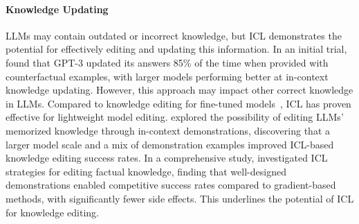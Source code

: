 \paragraph{Knowledge Updating}
LLMs may contain outdated or incorrect knowledge, but ICL demonstrates the potential for effectively editing and updating this information. In an initial trial, \citet{reliable} found that GPT-3 updated its answers 85\% of the time when provided with counterfactual examples, with larger models performing better at in-context knowledge updating. However, this approach may impact other correct knowledge in LLMs.
Compared to knowledge editing for fine-tuned models~\cite{editingfact}, ICL has proven effective for lightweight model editing. \citet{reliable} explored the possibility of editing LLMs' memorized knowledge through in-context demonstrations, discovering that a larger model scale and a mix of demonstration examples improved ICL-based knowledge editing success rates. In a comprehensive study, \citet{ike} investigated ICL strategies for editing factual knowledge, finding that well-designed demonstrations enabled competitive success rates compared to gradient-based methods, with significantly fewer side effects. This underlines the potential of ICL for knowledge editing.
